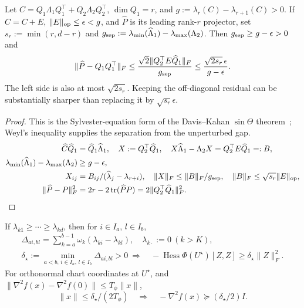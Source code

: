 \begin{proposition}\label{prop:rigid-gap}
Let $C=Q_1\Lambda_1Q_1^\top+Q_2\Lambda_2Q_2^\top$, $\dim Q_1=r$, and
$g:=\lambda_r(C)-\lambda_{r+1}(C)>0$. If $\widehat C=C+E$,
$\|E\|_{\mathrm{op}}\le\epsilon<g$, and $\widehat P$ is its leading rank-$r$ projector,
set $s_r:=\min(r,d-r)$ and
$g_{\rm sep}:=\lambda_{\min}(\widehat\Lambda_1)-\lambda_{\max}(\Lambda_2)$.
Then $g_{\rm sep}\ge g-\epsilon>0$ and
\begin{equation}
 \|\widehat P-Q_1Q_1^\top\|_F
 \le\frac{\sqrt2\|Q_2^\top E\widehat Q_1\|_F}{g_{\rm sep}}
 \le\frac{\sqrt{2s_r}\,\epsilon}{g-\epsilon}.
\end{equation}
The left side is also at most $\sqrt{2s_r}$. Keeping the off-diagonal residual
can be substantially sharper than replacing it by $\sqrt{s_r}\epsilon$.
\end{proposition}
\begin{proof}
This is the Sylvester-equation form of the Davis--Kahan
$\sin\Theta$ theorem~\citep{davis_kahan}; Weyl's inequality supplies the
separation from the unperturbed gap.
\begin{align}
 \widehat C\widehat Q_1&=\widehat Q_1\widehat\Lambda_1,\quad
 X:=Q_2^\top\widehat Q_1,\quad
 X\widehat\Lambda_1-\Lambda_2X=Q_2^\top E\widehat Q_1=:B,\\
 \lambda_{\min}(\widehat\Lambda_1)-\lambda_{\max}(\Lambda_2)
 &\ge g-\epsilon,\\
 X_{ij}&=B_{ij}/(\widehat\lambda_j-\lambda_{r+i}),\quad
 \|X\|_F\le\|B\|_F/g_{\rm sep},\quad
 \|B\|_F\le\sqrt{s_r}\|E\|_{\mathrm{op}},\\
 \|\widehat P-P\|_F^2&=2r-2\operatorname{tr}(\widehat P P)=2\|Q_2^\top\widehat Q_1\|_F^2.
\end{align}
\end{proof}
\begin{corollary}
If $\lambda_{k1}\ge\cdots\ge\lambda_{kd}$, then for $i\in I_a$, $l\in I_b$,
\begin{gather}
 \Delta_{ai,bl}=\sum_{k=a}^{b-1}\omega_k(\lambda_{ki}-\lambda_{kl}),
 \quad \lambda_{k\cdot}:=0\ (k>K),\\
 \delta_\star:=\min_{a<b,\,i\in I_a,\,l\in I_b}\Delta_{ai,bl}>0
 \ \Longrightarrow\quad
 -\operatorname{Hess}\Phi(U^\star)[Z,Z]\ge\delta_\star\|Z\|_F^2.
\end{gather}
For orthonormal chart coordinates at $U^\star$, and
$\|\nabla^2f(x)-\nabla^2f(0)\|\le T_\phi\|x\|$,
\begin{equation}
 \|x\|\le\delta_\star/(2T_\phi)
 \quad\Longrightarrow\quad-\nabla^2f(x)\succeq(\delta_\star/2)I.
\end{equation}
\end{corollary}
